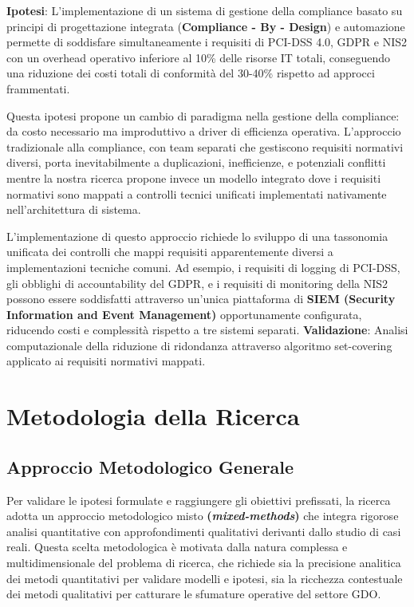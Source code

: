 \textbf{Ipotesi}: L'implementazione di un sistema di gestione della compliance basato su principi di progettazione integrata (\textbf{Compliance - By - Design}) e automazione permette di soddisfare simultaneamente i requisiti di PCI-DSS 4.0, GDPR e NIS2 con un overhead operativo inferiore al 10\% delle risorse IT totali, conseguendo una riduzione dei costi totali di conformità del 30-40\% rispetto ad approcci frammentati.

Questa ipotesi propone un cambio di paradigma nella gestione della compliance: da costo necessario ma improduttivo a driver di efficienza operativa. L'approccio tradizionale alla compliance, con team separati che gestiscono requisiti normativi diversi, porta inevitabilmente a duplicazioni, inefficienze, e potenziali conflitti mentre la nostra ricerca propone invece un modello integrato dove i requisiti normativi sono mappati a controlli tecnici unificati implementati nativamente nell'architettura di sistema.

L'implementazione di questo approccio richiede lo sviluppo di una tassonomia unificata dei controlli che mappi requisiti apparentemente diversi a implementazioni tecniche comuni. Ad esempio, i requisiti di logging di PCI-DSS, gli obblighi di accountability del GDPR, e i requisiti di monitoring della NIS2 possono essere soddisfatti attraverso un'unica piattaforma di \textbf{SIEM (Security Information and Event Management)} opportunamente configurata, riducendo costi e complessità rispetto a tre sistemi separati.
\textbf{Validazione}: Analisi computazionale della riduzione di ridondanza 
attraverso algoritmo set-covering applicato ai requisiti normativi mappati.

\section{Metodologia della Ricerca}

\subsection{Approccio Metodologico Generale}

Per validare le ipotesi formulate e raggiungere gli obiettivi prefissati, la ricerca adotta un approccio metodologico misto \textbf{(\textit{mixed-methods})} che integra rigorose analisi quantitative con approfondimenti qualitativi derivanti dallo studio di casi reali. Questa scelta metodologica è motivata dalla natura complessa e multidimensionale del problema di ricerca, che richiede sia la precisione analitica dei metodi quantitativi per validare modelli e ipotesi, sia la ricchezza contestuale dei metodi qualitativi per catturare le sfumature operative del settore GDO.

